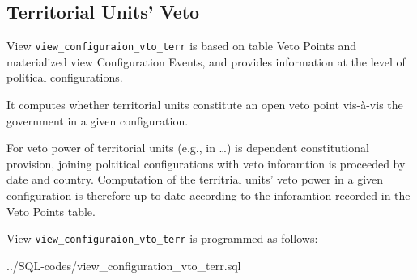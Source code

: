 \subsection{Territorial Units' Veto}\label{view_configuration_vto_terr}
View \texttt{\footnotesize view\_configuraion\_vto\_terr} is based on table Veto Points and materialized view Configuration Events, and provides information at the level of political configurations.

It computes whether territorial units constitute an open veto point vis-\`a-vis the government in a given configuration.

For veto power of territorial units (e.g., in \ldots) is dependent constitutional provision,
joining poltitical configurations with veto inforamtion is proceeded by date and country. 
Computation of the territrial units' veto power in a given configuration is therefore up-to-date according to the inforamtion recorded in the Veto Points table.

View \texttt{\footnotesize view\_configuraion\_vto\_terr} is programmed as follows:

%
{../SQL-codes/view_configuration_vto_terr.sql}




